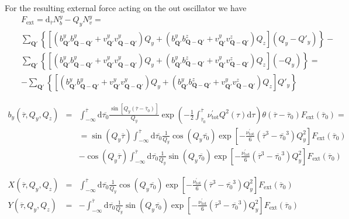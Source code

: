 \documentclass[prb,singlecolumn]{revtex4}
\begin{document}
For the resulting external force acting on the out oscillator we have
%
\begin{eqnarray}
&&F_\mathrm{ext} =\mathrm{d}_{\overline{\tau}}N_b^y - Q_yN_v^y=\nonumber \\
&&\sum_{\mathbf{Q}'}\left\{ \left[(b_{\mathbf{Q}'}^yb_{\mathbf{Q}-\mathbf{Q}'}^y + v_{\mathbf{Q}'}^yv_{\mathbf{Q}-\mathbf{Q}'}^y)Q_y + (b_{\mathbf{Q}'}^yb_{\mathbf{Q}-\mathbf{Q}'}^z + v_{\mathbf{Q}'}^yv_{\mathbf{Q}-\mathbf{Q}'}^z)Q_z\right](Q_y-Q'_y)\right\} -\\
&&\sum_{\mathbf{Q}'}\left\{ \left[(b_{\mathbf{Q}'}^yb_{\mathbf{Q}-\mathbf{Q}'}^y + v_{\mathbf{Q}'}^yv_{\mathbf{Q}-\mathbf{Q}'}^y)Q_y + (b_{\mathbf{Q}'}^yb_{\mathbf{Q}-\mathbf{Q}'}^z + v_{\mathbf{Q}'}^yv_{\mathbf{Q}-\mathbf{Q}'}^z)Q_z\right](-Q_y)\right\}=\\
&&-\sum_{\mathbf{Q}'}\left\{ \left[(b_{\mathbf{Q}'}^yb_{\mathbf{Q}-\mathbf{Q}'}^y + v_{\mathbf{Q}'}^yv_{\mathbf{Q}-\mathbf{Q}'}^y)Q_y + (b_{\mathbf{Q}'}^yb_{\mathbf{Q}-\mathbf{Q}'}^z + v_{\mathbf{Q}'}^yv_{\mathbf{Q}-\mathbf{Q}'}^z)Q_z\right]Q'_y\right\}
\end{eqnarray}



\begin{eqnarray}
b_y(\overline{\tau},Q_y,Q_z) &=&
\int_{-\infty}^{\overline{\tau}} \mathrm{d}\overline{\tau_0} \frac{\sin[Q_y(\overline{\tau}-\overline{\tau}_0)]}{Q_y}
\exp\left(-\frac12\int^{\overline{\tau}}_{\overline{\tau}_0} \nu^\prime_\mathrm{tot} Q^2(\tau) \mathrm{d}\tau \right) \theta(\overline{\tau}-\overline{\tau}_0) F_\mathrm{ext}(\overline{\tau}_0)=\\
&&= \sin(Q_y\overline{\tau}) \int^{\overline{\tau}}_{-\infty}\mathrm{d}\overline{\tau_0} \frac1{Q_y}\cos(Q_y\overline{\tau_0})\exp\left[ -\frac{\nu^{\prime}_{\mathrm{tot}}}{6}(\overline{\tau}^3 - \overline{\tau_0}^3)Q_y^2 \right]  F_\mathrm{ext}(\overline{\tau}_0) \nonumber \\
&& - \cos(Q_y\overline{\tau}) \int^{\overline{\tau}}_{-\infty}\mathrm{d}\overline{\tau_0} \frac1{Q_y}\sin(Q_y\overline{\tau_0})\exp\left[ -\frac{\nu^{\prime}_{\mathrm{tot}}}{6}(\overline{\tau}^3 - \overline{\tau_0}^3)Q_y^2 \right]  F_\mathrm{ext}(\overline{\tau}_0) \nonumber
\end{eqnarray}

\begin{eqnarray}
 X(\overline{\tau},Q_y,Q_z) &=& \int^{\overline{\tau}}_{-\infty}\mathrm{d}\overline{\tau_0} \frac1{Q_y}\cos(Q_y\overline{\tau_0})\exp\left[ -\frac{\nu^{\prime}_{\mathrm{tot}}}{6}(\overline{\tau}^3 - \overline{\tau_0}^3)Q_y^2 \right]  F_\mathrm{ext}(\overline{\tau}_0) \nonumber \\
 Y(\overline{\tau},Q_y,Q_z) &=& - \int^{\overline{\tau}}_{-\infty}\mathrm{d}\overline{\tau_0} \frac1{Q_y}\sin(Q_y\overline{\tau_0})\exp\left[ -\frac{\nu^{\prime}_{\mathrm{tot}}}{6}(\overline{\tau}^3 - \overline{\tau_0}^3)Q_y^2 \right]  F_\mathrm{ext}(\overline{\tau}_0) \nonumber 
\end{eqnarray}
\end{document}
